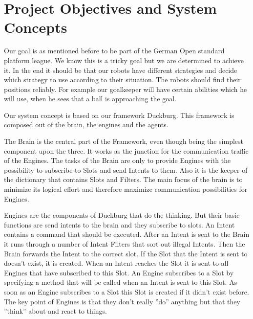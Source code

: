 \documentclass[12pt]{article}
\theoremstyle{definition}
\begin{document}
\pagebreak

\section{Project Objectives and System Concepts}

Our goal is as mentioned before to be part of the German Open standard platform league. We know this is a tricky goal but we are determined to achieve it. In the end it should be that our robots have different strategies and decide which strategy to use according to their situation. The robots should find their positions reliably. For example our goalkeeper will have certain abilities which he will use, when he sees that a ball is approaching the goal. 
\newline

Our system concept is based on our framework Duckburg. This framework is composed out of the brain, the engines and the agents.
\newline

The Brain is the central part of the Framework, even though being the simplest component upon the three. It works as the junction for the communication traffic of the Engines. The tasks of the Brain are only to provide Engines with the possibility to subscribe to Slots and send Intents to them. Also it is the keeper of the dictionary that contains Slots and Filters. The main focus of the brain is to minimize its logical effort and therefore maximize communication possibilities for Engines.\linebreak

Engines are the components of Duckburg that do the thinking. But their basic functions are send intents to the brain and they subscribe to slots.  An Intent contains a command that should be executed. After an Intent is sent to the Brain it runs through a number of Intent Filters that sort out illegal Intents. Then the Brain forwards the Intent to the correct slot. If the Slot that the Intent is sent to doesn’t exist, it is created. When an Intent reaches the Slot it is sent to all Engines that have subscribed to this Slot. An Engine subscribes to a Slot by specifying a method that will be called when an Intent is sent to this Slot. As soon as an Engine subscribes to a Slot this Slot is created if it didn’t exist before. The key point of Engines is that they don’t really ”do” anything but that they ”think” about and react to things.\linebreak

\pagebreak
\end{document}

